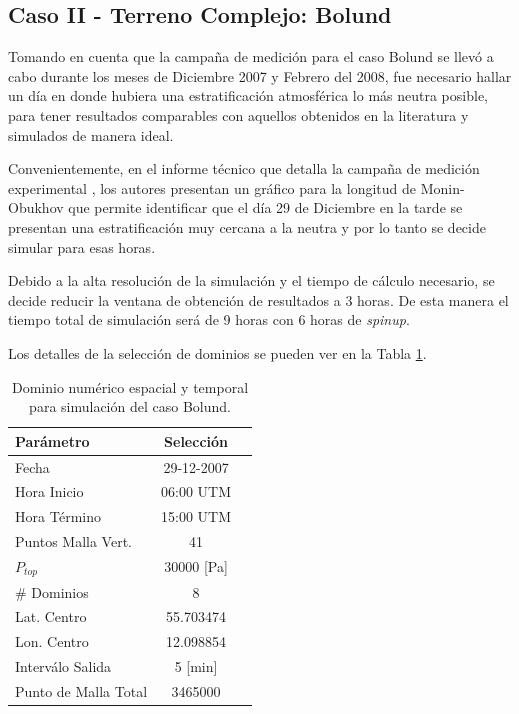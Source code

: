 \newpage










\subsection{Caso II - Terreno Complejo: Bolund}
Tomando en cuenta que la campaña de medición para el caso Bolund se llevó a cabo durante los meses de Diciembre 2007 y Febrero del 2008, fue necesario hallar un día en donde hubiera una estratificación atmosférica lo más neutra posible, para tener resultados comparables con aquellos obtenidos en la literatura y simulados de manera ideal.

Convenientemente, en el informe técnico que detalla la campaña de medición experimental \citep{3d4285ac04444eb3b9775baf9af052c6}, los autores presentan un gráfico para la longitud de Monin-Obukhov que permite identificar que el día 29 de Diciembre en la tarde se presentan una estratificación muy cercana a la neutra y por lo tanto se decide simular para esas horas.

Debido a la alta resolución de la simulación y el tiempo de cálculo necesario, se decide reducir la ventana de obtención de resultados a 3 horas. De esta manera el tiempo total de simulación será de 9 horas con 6 horas de \emph{spinup}.

Los detalles de la selección de dominios se pueden ver en la Tabla \ref{tab:05_config_bol}.

\begin{table}[h!]
	\caption{Dominio numérico espacial y temporal para simulación del caso Bolund.}\label{tab:05_config_bol}
	\centering\footnotesize
	\begin{tabular}{lcc}
		\toprule
		Parámetro & Selección \\
		\midrule
		Fecha	 	 & 29-12-2007   \\
		Hora Inicio	 	 & 06:00 UTM\\
		Hora Término	 		 & 15:00 UTM\\
		Puntos Malla Vert.	 	 & 41   \\
		$P_{top}$ 	& 30000 [Pa]\\
		\# Dominios	& 8   \\
		Lat. Centro	& 55.703474   \\
		Lon. Centro	& 12.098854   \\
		Interválo Salida & 5 [min]\\
		Punto de Malla Total & 3465000\\
		\bottomrule
	\end{tabular}
\end{table}

